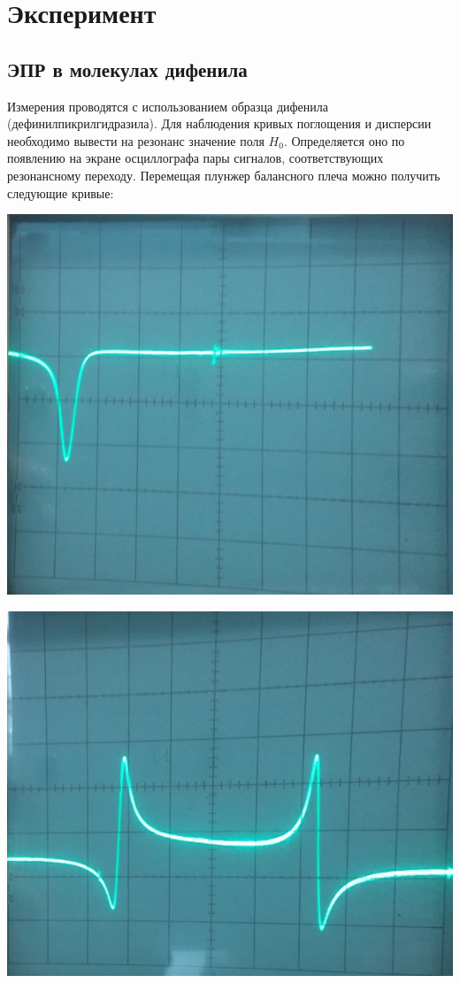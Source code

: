 \section{Эксперимент}
\subsection{ЭПР в молекулах дифенила}
Измерения проводятся с использованием образца дифенила (дефинилпикрилгидразила). Для наблюдения кривых поглощения и дисперсии необходимо вывести на резонанс значение поля $H_0$. Определяется оно по появлению на экране осциллографа пары сигналов, соответствующих резонансному переходу. Перемещая плунжер балансного плеча можно получить следующие кривые:
\begin{center}
\begin{minipage}{0.45\linewidth}
        \centering
        \includegraphics[width=\linewidth]{fig/chi_p-2.jpg}  
        \vspace{-20pt}
        \label{fig:4}
    \end{minipage} 
\hfill     
    \begin{minipage}{0.45\linewidth}
        \includegraphics[width=\linewidth]{fig/chi_d-2.jpg} 

\end{minipage}
\end{center}
